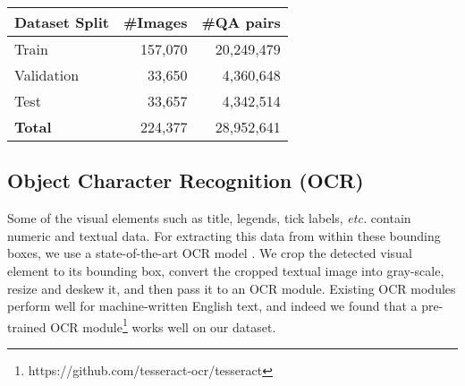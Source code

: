 \documentclass[10pt,twocolumn,letterpaper]{article}
\begin{document}
\begin{table}[]
\footnotesize
\begin{center}
\begin{tabular}{|l|r|r|}
\hline
\textbf{Dataset Split} & \textbf{\#Images} & \textbf{\#QA pairs} \\ \hline
Train & 157,070 & 20,249,479 \\
Validation & 33,650 & 4,360,648 \\
Test & 33,657 & 4,342,514 \\ \hline
\textbf{Total} & 224,377 & 28,952,641 \\ \hline
\end{tabular}
\caption{}
\label{basic-stats-old}
\end{center}
\end{table}

\subsection{Object Character Recognition (OCR)}
Some of the visual elements such as title, legends, tick labels, \textit{etc.} contain numeric and textual data. For extracting this data from within these bounding boxes, we use a state-of-the-art OCR model \cite{Smith07}. We crop the detected visual element to its bounding box, convert the cropped textual image into gray-scale, resize and deskew it, and then pass it to an OCR module. 
Existing OCR modules perform well for machine-written English text, and indeed we found that a pre-trained OCR module\footnote{https://github.com/tesseract-ocr/tesseract} works well on our dataset. 
\end{document}
